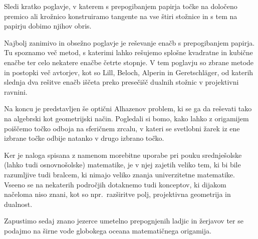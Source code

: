 Sledi kratko poglavje, v katerem s prepogibanjem papirja točke na določeno premico ali krožnico konstruiramo tangente na vse štiri stožnice in s tem na papirju dobimo njihov obris.

Najbolj zanimivo in obsežno poglavje je reševanje enačb s prepogibanjem papirja. Tu spoznamo več metod, s katerimi lahko rešujemo splošne kvadratne in kubične enačbe ter celo nekatere enačbe četrte stopnje. V tem poglavju so zbrane metode in postopki več avtorjev, kot so Lill, Beloch, Alperin in Geretschläger, od katerih slednja dva rešitve enačb iščeta preko presečišč dualnih stožnic v projektivni ravnini.

Na koncu je predstavljen še optični Alhazenov problem, ki se ga da reševati tako na algebrski kot geometrijski način. Pogledali si bomo, kako lahko z origamijem poiščemo točko odboja na sferičnem zrcalu, v kateri se svetlobni žarek iz ene izbrane točke odbije natanko v drugo izbrano točko.

Ker je naloga spisana z namenom morebitne uporabe pri pouku srednješolske (lahko tudi osnovnošolske) matematike, je v njej zajetih veliko tem, ki bi bile razumljive tudi bralcem, ki nimajo veliko znanja univerzitetne matematike. Vseeno se na nekaterih področjih dotaknemo tudi konceptov, ki dijakom načeloma niso znani, kot so npr.\ razširitve polj, projektivna geometrija in dualnost.

Zapustimo sedaj znano jezerce umetelno prepognjenih ladjic in žerjavov ter se podajmo na širne vode globokega oceana matematičnega origamija.